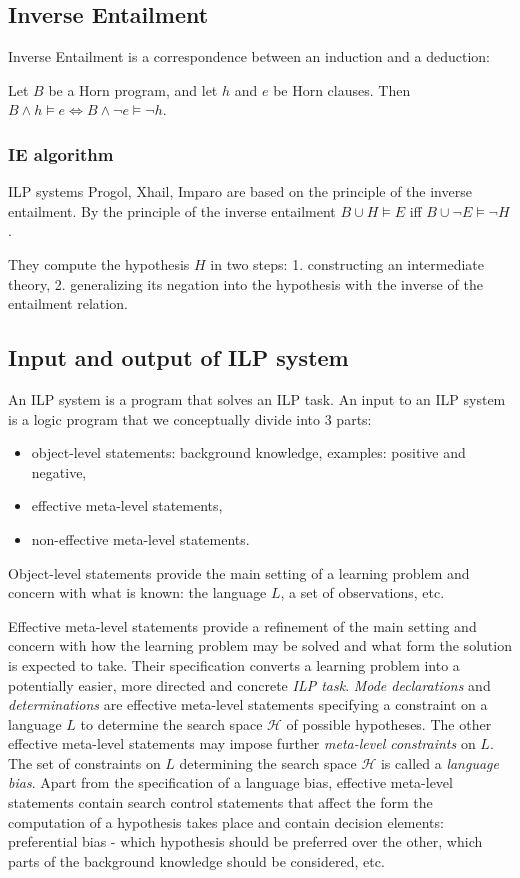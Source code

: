 \subsection{Inverse Entailment}
Inverse Entailment is a correspondence between an induction and a deduction:
\begin{thm}\cite{kimber2012learning}
Let $B$ be a Horn program, and let $h$ and $e$ be
Horn clauses. Then $B \wedge h \models e \iff B \wedge \neg e \models \neg h$.
\end{thm}

\subsubsection{IE algorithm\cite{yamamoto2012inverse}}\label{inverse_entailement_algorithm}
ILP systems Progol, Xhail, Imparo are based on the principle of the inverse entailment. By the principle of the inverse entailment $B \cup H \models E$ iff
$B \cup \neg E \models \neg H$.
 
They compute the hypothesis $H$ in two steps:
1. constructing an intermediate theory, 2. generalizing its negation into the hypothesis with the inverse of the entailment relation.

\subsection{Input and output of ILP system}
An ILP system is a program that solves an ILP task.
An input to an ILP system is a logic program that we conceptually divide into 3 parts:
\begin{itemize}
\item object-level statements: background knowledge, examples: positive and negative,
\item effective meta-level statements,
\item non-effective meta-level statements.
\end{itemize}

Object-level statements provide the main setting of a learning problem and concern with what is known: the language $L$, a set of observations, etc.

Effective meta-level statements provide a refinement of the main setting and concern with how the learning problem may be solved and what form the solution is expected to take. Their specification converts a learning problem into a potentially easier, more directed and concrete \emph{ILP task}.
\emph{Mode declarations} and \emph{determinations} are effective meta-level statements specifying a constraint on a language $L$ to determine the search space $\mathcal{H}$ of possible hypotheses. The other effective meta-level statements may impose further \emph{meta-level constraints} on $L$. The set of constraints on $L$ determining the search space $\mathcal{H}$ is called a \emph{language bias}.
Apart from the specification of a language bias, effective meta-level statements contain search control statements that affect the form the computation of a hypothesis takes place and contain decision elements: preferential bias - which hypothesis should be preferred over the other, which parts of the background knowledge should be considered, etc.

